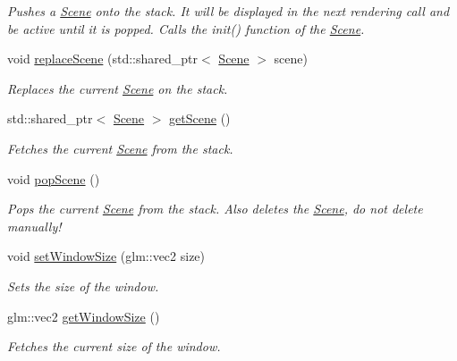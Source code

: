 \begin{DoxyCompactItemize}
\begin{DoxyCompactList}\small\item\em Pushes a \mbox{\hyperlink{classsage_1_1Scene}{Scene}} onto the stack. It will be displayed in the next rendering call and be active until it is popped. Calls the init() function of the \mbox{\hyperlink{classsage_1_1Scene}{Scene}}. \end{DoxyCompactList}\item 
void \mbox{\hyperlink{classsage_1_1Application_ac0458ccb5b0a4aae4bcb1fc958f369f4}{replace\+Scene}} (std\+::shared\+\_\+ptr$<$ \mbox{\hyperlink{classsage_1_1Scene}{Scene}} $>$ scene)
\begin{DoxyCompactList}\small\item\em Replaces the current \mbox{\hyperlink{classsage_1_1Scene}{Scene}} on the stack. \end{DoxyCompactList}\item 
std\+::shared\+\_\+ptr$<$ \mbox{\hyperlink{classsage_1_1Scene}{Scene}} $>$ \mbox{\hyperlink{classsage_1_1Application_a4d40d8fae7f9f26cf45d8fca6e811c3f}{get\+Scene}} ()
\begin{DoxyCompactList}\small\item\em Fetches the current \mbox{\hyperlink{classsage_1_1Scene}{Scene}} from the stack. \end{DoxyCompactList}\item 
void \mbox{\hyperlink{classsage_1_1Application_a47b5bec61b3d93cbb4998b42d0d2ea47}{pop\+Scene}} ()
\begin{DoxyCompactList}\small\item\em Pops the current \mbox{\hyperlink{classsage_1_1Scene}{Scene}} from the stack. Also deletes the \mbox{\hyperlink{classsage_1_1Scene}{Scene}}, do not delete manually! \end{DoxyCompactList}\item 
void \mbox{\hyperlink{classsage_1_1Application_a991df90e69398b7fe8eeb0fa2df3d92e}{set\+Window\+Size}} (glm\+::vec2 size)
\begin{DoxyCompactList}\small\item\em Sets the size of the window. \end{DoxyCompactList}\item 
glm\+::vec2 \mbox{\hyperlink{classsage_1_1Application_ac0fa1750ee8dcacc37cc9eaed72f12f9}{get\+Window\+Size}} ()
\begin{DoxyCompactList}\small\item\em Fetches the current size of the window. \end{DoxyCompactList}\item 

\end{DoxyCompactItemize}

